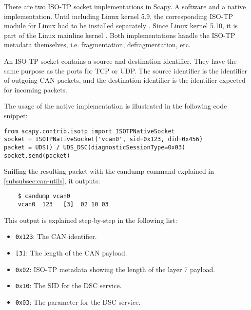 There are two ISO-TP socket implementations in Scapy. A software and a native implementation. Until including Linux kernel 5.9, the corresponding ISO-TP module for Linux had to be installed separately \cite{isotp-module}. Since Linux kernel 5.10, it is part of the Linux mainline kernel \cite{isotp-commit}. Both implementations handle the ISO-TP metadata themselves, i.e.  fragmentation, defragmentation, etc.

An ISO-TP socket contains a source and destination identifier. They have the same purpose as the ports for TCP or UDP. The source identifier is the identifier of outgoing CAN packets, and the destination identifier is the identifier expected for incoming packets.

The usage of the native implementation is illustrated in the following code snippet:

\begin{samepage}
\begin{verbatim}
from scapy.contrib.isotp import ISOTPNativeSocket
socket = ISOTPNativeSocket('vcan0', sid=0x123, did=0x456)
packet = UDS() / UDS_DSC(diagnosticSessionType=0x03)
socket.send(packet)
\end{verbatim}
\end{samepage}

Sniffing the resulting packet with the candump command explained in \autoref{subsubsec:can-utils}, it outputs:

\begin{samepage}
\begin{verbatim}
    $ candump vcan0
    vcan0  123   [3]  02 10 03
\end{verbatim}
\end{samepage}

This output is explained step-by-step in the following list:

\begin{itemize}
    \item \texttt{0x123}: The CAN identifier.
    \item \texttt{[3]}: The length of the CAN payload.
    \item \texttt{0x02}: ISO-TP metadata showing the length of the layer 7 payload.
    \item \texttt{0x10}: The SID for the DSC service.
    \item \texttt{0x03}: The parameter for the DSC service.
\end{itemize}

